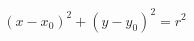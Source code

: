 \documentclass[12pt]{article}
\begin{document}
\[
    (x - x_0)^2 + (y - y_0)^2 = r^2
\]
\end{document}
